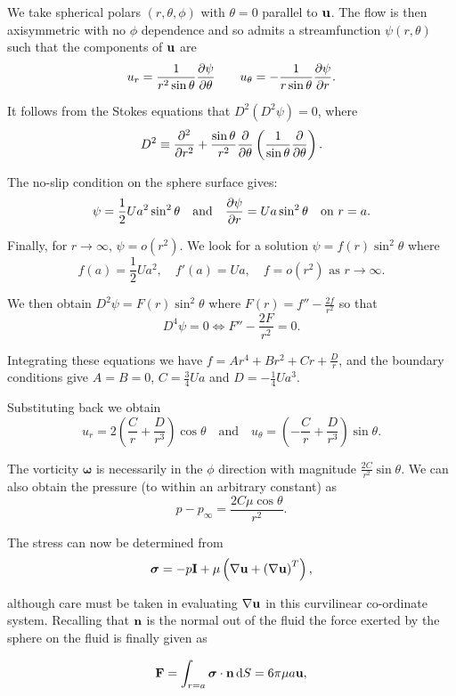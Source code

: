 \documentclass{notes}
\newcommand{\om}{\boldsymbol{\omega}}
\newcommand{\bs}{\boldsymbol{\sigma}}
\theoremstyle{plain}
\begin{document}
We take spherical polars $(r,\theta,\phi)$ with $\theta = 0$ parallel
to $\mathbf{u}$.  The flow is then axisymmetric with no $\phi$ dependence
and so admits a streamfunction $\psi(r,\theta)$ such that the components of
$\mathbf{u}$ are
\[
u_r = \frac{1}{r^2 \sin \theta} \frac{\partial \psi}{\partial \theta} \qquad
u_\theta = - \frac{1}{r \sin \theta} \frac{\partial \psi}{\partial r}.
\]

It follows from the Stokes equations that $D^2 \left(D^2 \psi \right) = 0$,
where
\[
D^2 \equiv \frac{\partial ^2}{\partial r^2} + \frac{\sin \theta}{r^2} \frac{\partial }{\partial \theta}
\left( \frac{1}{\sin \theta} \frac{\partial }{\partial \theta} \right).
\]

The no-slip condition on the sphere surface gives:
\[
\psi = \frac{1}{2} U a^2 \sin^2 \theta \quad \text{and} \quad
\frac{\partial \psi}{\partial r} = U a \sin^2 \theta \quad \text{on } r = a.
\]

Finally, for $r \to \infty$, $\psi = o(r^2)$.  We look for a solution
$\psi = f(r) \sin^2 \theta$ where
\[
f(a) = \frac{1}{2} U a^2, \quad f'(a) = U a, \quad f = o(r^2) \text{ as }
r \to \infty.
\]

We then obtain $D^2 \psi = F(r) \sin^2 \theta$ where $F(r)
= f'' - \frac{2 f}{r^2}$ so that
\[
D^4 \psi = 0 \Leftrightarrow F'' - \frac{2 F}{r^2} = 0.
\]

Integrating these equations we have
$f = A r^4 + B r^2 + C r + \frac{D}{r}$, and the boundary conditions give
$A = B = 0$, $C = \frac{3}{4} U a$ and $D = - \frac{1}{4} U a^3$.

Substituting back we obtain
\[
u_r = 2 \left( \frac{C}{r} + \frac{D}{r^3} \right) \cos \theta
\quad \text{and} \quad u_\theta = \left( - \frac{C}{r} + \frac{D}{r^3}
\right) \sin \theta.
\]

The vorticity $\om$ is necessarily in the $\phi$ direction with magnitude
$\frac{2 C}{r^2} \sin \theta$.  We can also obtain the pressure
(to within an arbitrary constant) as
\[
p - p_\infty = \frac{2 C \mu \cos \theta}{r^2}.
\]

The stress can now be determined from
\[
\bs = - p \vect{I} + \mu \left( \nabla \vu + \left(\nabla \vu\right)^T \right),
\]

although care must be taken in evaluating $\nabla \mathbf{u}$ in this curvilinear
co-ordinate system.  Recalling that $\mathbf{n}$ is the normal out of the fluid
the force exerted by the sphere on the fluid is finally given as

\begin{equation}\label{eq:stokeslaw}
\vF = \int_{r = a} \bs \cdot \vn\, \ud S = 6 \pi \mu a \vu,
\end{equation}
\end{document}
